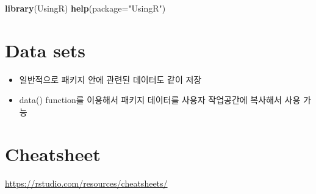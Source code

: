 \documentclass[
]{book}
\newenvironment{Shaded}{\begin{snugshade}}{\end{snugshade}}
\newcommand{\DataTypeTok}[1]{\textcolor[rgb]{0.13,0.29,0.53}{#1}}
\newcommand{\KeywordTok}[1]{\textcolor[rgb]{0.13,0.29,0.53}{\textbf{#1}}}
\newcommand{\NormalTok}[1]{#1}
\newcommand{\OperatorTok}[1]{\textcolor[rgb]{0.81,0.36,0.00}{\textbf{#1}}}
\newcommand{\StringTok}[1]{\textcolor[rgb]{0.31,0.60,0.02}{#1}}
\providecommand{\tightlist}{%
  \setlength{\itemsep}{0pt}\setlength{\parskip}{0pt}}
\begin{document}
\begin{Shaded}
\begin{Highlighting}[]
\KeywordTok{library}\NormalTok{(UsingR)}
\KeywordTok{help}\NormalTok{(}\DataTypeTok{package=}\StringTok{"UsingR"}\NormalTok{)}
\end{Highlighting}
\end{Shaded}

\hypertarget{data-sets}{%
\section{Data sets}\label{data-sets}}

\begin{itemize}
\tightlist
\item
  일반적으로 패키지 안에 관련된 데이터도 같이 저장
\item
  data() function를 이용해서 패키지 데이터를 사용자 작업공간에 복사해서 사용 가능
\end{itemize}

\begin{Shaded}
\end{Shaded}

\hypertarget{cheatsheet}{%
\section{Cheatsheet}\label{cheatsheet}}

\url{https://rstudio.com/resources/cheatsheets/}
\end{document}
